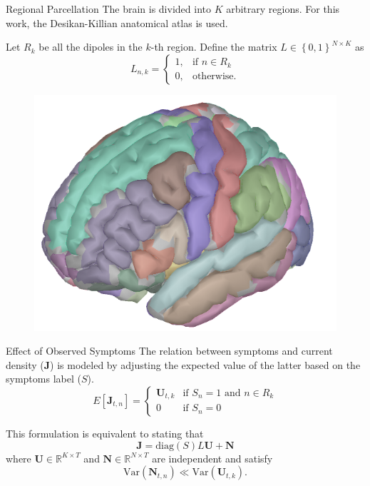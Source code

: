 \documentclass[progressbar=head]{beamer}
\newcommand{\set}[1]{ \left\{ #1 \right\} }
\newcommand{\ppar}[1]{ \left( #1 \right) }
\newcommand{\spar}[1]{ \left[ #1 \right] }
\newcommand{\J}{\mathbf{J}}
\newcommand{\U}{\mathbf{U}}
\newcommand{\N}{\mathbf{N}}
\newcommand{\R}{\mathbb{R}}
\begin{document}
\begin{frame}{Regional Parcellation}
The  brain is divided into $K$ arbitrary regions. For this work, the Desikan-Killian anatomical atlas is used.

Let $R_k$ be all the dipoles in the $k$-th region. Define the matrix $L\in \set{0,1}^{N\times K}$ as
\begin{equation}
    L_{n,k} = \begin{cases}
        1, &\text{if } n\in R_k \\
        0, &\text{otherwise.}
    \end{cases}
\end{equation}

\begin{figure}
\centering
\includegraphics[width=0.3\linewidth]{./img_oldbeamer/desikan}

\end{figure}

\end{frame}

\begin{frame}{Effect of Observed Symptoms}
The relation between symptoms and current density ($\J$) is modeled by adjusting the expected value of the latter based on the symptoms label ($S$).
\begin{equation}
    E\spar{\J_{t,n}} = 
    \begin{cases}
        \U_{t,k} & \text{if } S_n=1 \text{ and } n\in R_k \\
        0 & \text{if } S_n=0
    \end{cases}
\end{equation}

This formulation is equivalent to stating that
\begin{equation}
    \J = \text{diag}\ppar{S} L \U + \N
\end{equation}
where $\mathbf{U}\in \R^{K\times T}$ and $\mathbf{N}\in \R^{N\times T}$ are independent and satisfy
\begin{equation}
    \text{Var}\ppar{\N_{t,n}} \ll \text{Var}\ppar{\U_{t,k}}.
\end{equation}
\end{frame}
\end{document}
